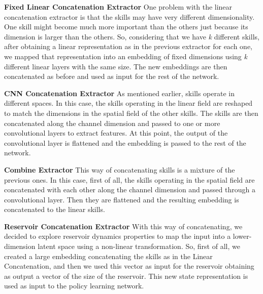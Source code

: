 \textbf{Fixed Linear Concatenation Extractor}
One problem with the linear concatenation extractor is that the skills may have very different dimensionality. One skill might become much more important than the others just because its dimension is larger than the others. So, considering that we have \textit{k} different skills, after obtaining a linear representation as in the previous extractor for each one, we mapped that representation into an embedding of fixed dimensions using \textit{k} different linear layers with the same size.
The new embeddings are then concatenated as before and used as input for the rest of the network.

\textbf{CNN Concatenation Extractor}
As mentioned earlier, skills operate in different spaces. In this case, the skills operating in the linear field are reshaped to match the dimensions in the spatial field of the other skills.
The skills are then concatenated along the channel dimension and passed to one or more convolutional layers to extract features.
At this point, the output of the convolutional layer is flattened and the embedding is passed to the rest of the network.

\textbf{Combine Extractor}
This way of concatenating skills is a mixture of the previous ones. In this case, first of all, the skills operating in the spatial field are concatenated with each other along the channel dimension and passed through a convolutional layer. Then they are flattened and the resulting embedding is concatenated to the linear skills.

\textbf{Reservoir Concatenation Extractor}
With this way of concatenating, we decided to explore reservoir dynamics properties to map the input into a lower-dimension latent space using a non-linear transformation.
So, first of all, we created a large embedding concatenating the skills as in the Linear Concatenation, and then we used this vector as input for the reservoir obtaining as output a vector of the size of the reservoir. This new state representation is used as input to the policy learning network.

